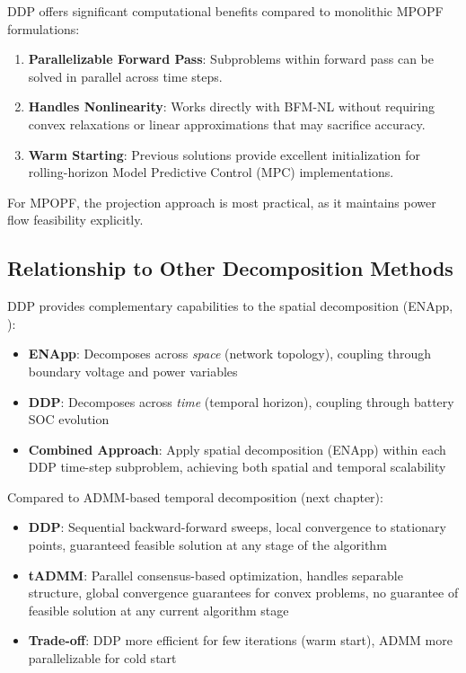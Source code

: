 DDP offers significant computational benefits compared to monolithic MPOPF formulations:

\begin{enumerate}        
    \item \textbf{Parallelizable Forward Pass}: Subproblems within forward pass can be solved in parallel across time steps.
    
    \item \textbf{Handles Nonlinearity}: Works directly with BFM-NL \cite{Farivar1} without requiring convex relaxations or linear approximations that may sacrifice accuracy.
    
    \item \textbf{Warm Starting}: Previous solutions provide excellent initialization for rolling-horizon Model Predictive Control (MPC) implementations.
\end{enumerate}

For MPOPF, the projection approach is most practical, as it maintains power flow feasibility explicitly.

\subsection{Relationship to Other Decomposition Methods}

DDP provides complementary capabilities to the spatial decomposition (ENApp, ):

\begin{itemize}
    \item \textbf{ENApp}: Decomposes across \textit{space} (network topology), coupling through boundary voltage and power variables
    \item \textbf{DDP}: Decomposes across \textit{time} (temporal horizon), coupling through battery SOC evolution
    \item \textbf{Combined Approach}: Apply spatial decomposition (ENApp) within each DDP time-step subproblem, achieving both spatial and temporal scalability
\end{itemize}

Compared to ADMM-based temporal decomposition (next chapter):
\begin{itemize}
    \item \textbf{DDP}: Sequential backward-forward sweeps, local convergence to stationary points, guaranteed feasible solution at any stage of the algorithm
    \item \textbf{tADMM}: Parallel consensus-based optimization, handles separable structure, global convergence guarantees for convex problems, no guarantee of feasible solution at any current algorithm stage
    \item \textbf{Trade-off}: DDP more efficient for few iterations (warm start), ADMM more parallelizable for cold start
\end{itemize}

